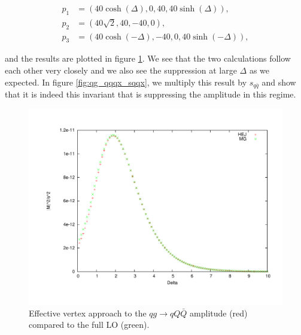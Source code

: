 \begin{equation}
\begin{split}
p_1 & = (40 \cosh(\Delta), 0, 40, 40 \sinh(\Delta)), \\
p_2 & = (40 \sqrt{2}, 40 , -40, 0), \\
p_3 & = (40 \cosh(-\Delta), -40, 0, 40 \sinh(-\Delta)), 
\end{split}
\end{equation}

and the results are plotted in figure \ref{fig:qg_qqqx}. We see that the two calculations follow each other very closely and we also see the suppression at large $\Delta$ as we expected. In figure \ref{fig:qg_qqqx_sqqx}, we multiply this result by $s_{q \bar{q}}$ and show that it is indeed this invariant that is suppressing the amplitude in this regime. 

\begin{figure}[H]
\centering
\includegraphics[scale= 0.45]{Images/qg_qqqx.pdf}
\caption{Effective vertex approach to the $qg \to qQ\bar{Q}$ amplitude (red) compared to the full LO (green).}
\label{fig:qg_qqqx}
\end{figure}

